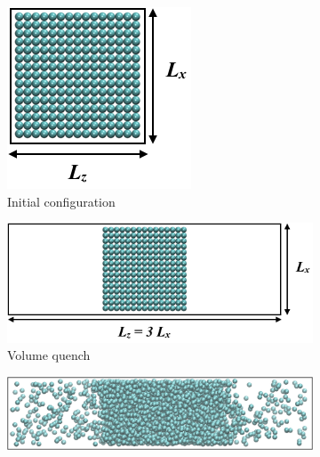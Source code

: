 \documentclass{scrbook}
\begin{document}
\begin{figure}
\centering
	\begin{subfigure}{0.4\textwidth} %
    \includegraphics[width=\textwidth]{gfx/image16.png}
		\caption{Initial configuration} %
	\end{subfigure}
	\begin{subfigure}{0.4\textwidth} %
    \includegraphics[width=\textwidth]{gfx/image17.png}
    \caption{Volume quench}
	\end{subfigure}
	\begin{subfigure}{0.8\textwidth} %
    \includegraphics[width=\textwidth]{gfx/image18.png}

\end{subfigure}
\end{figure}
\end{document}
